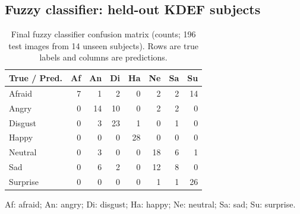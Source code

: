 \FloatBarrier
\subsection{Fuzzy classifier: held-out KDEF subjects}

\begin{table}[H]
\centering
\caption{Final fuzzy classifier confusion matrix
(counts; 196 test images from 14 unseen subjects).
Rows are true labels and columns are predictions.}
\label{tab:fuzzy-confusion}
\small
\begin{tabular}{lrrrrrrr}
\toprule
True / Pred. & Af & An & Di & Ha & Ne & Sa & Su \\
\midrule
Afraid   & 7 & 1 & 2 & 0 & 2 & 2 & 14 \\
Angry    & 0 & 14 & 10 & 0 & 2 & 2 & 0 \\
Disgust  & 0 & 3 & 23 & 1 & 0 & 1 & 0 \\
Happy    & 0 & 0 & 0 & 28 & 0 & 0 & 0 \\
Neutral  & 0 & 3 & 0 & 0 & 18 & 6 & 1 \\
Sad      & 0 & 6 & 2 & 0 & 12 & 8 & 0 \\
Surprise & 0 & 0 & 0 & 0 & 1 & 1 & 26 \\
\bottomrule
\end{tabular}

\smallskip
{\footnotesize
Af: afraid; An: angry; Di: disgust; Ha: happy;
Ne: neutral; Sa: sad; Su: surprise.
}
\end{table}
